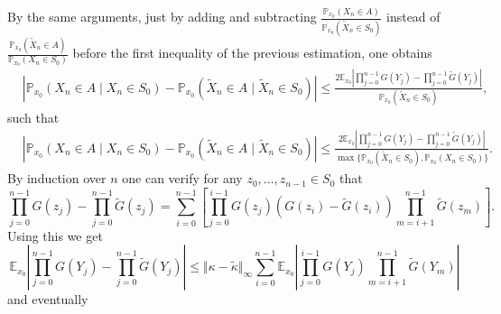 \documentclass{aptpub}
\begin{document}
By the same arguments, just by adding and subtracting $\frac{\mathbb{P}_{x_0}(X_n\in A)}{\mathbb{P}_{x_0}(\widetilde{X}_n\in S_0)}$ instead of $\frac{\mathbb{P}_{x_0}(\widetilde{X}_n\in A)}{\mathbb{P}_{x_0}(X_n\in S_0)}$ before the first inequality of the previous estimation, one obtains
\begin{align*}
		&  \left \vert \mathbb{P}_{x_0}(X_n\in A\mid X_n\in S_0) 
	- \mathbb{P}_{x_0}(\widetilde{X}_n\in A\mid \widetilde{X}_n\in S_0)\right \vert 
	\leq 	
  \frac{2  \mathbb{E}_{x_0}\left \vert \prod_{j=0}^{n-1} G(Y_j) 
		- \prod_{j=0}^{n-1} \widetilde{G}(Y_j) \right \vert}{\mathbb{P}_{x_0}(\widetilde{X}_n\in S_0)},
\end{align*}
such that
\begin{align} \label{eq: 1st_estimate}
& \left \vert \mathbb{P}_{x_0}(X_n\in A\mid X_n\in S_0) 
- \mathbb{P}_{x_0}(\widetilde{X}_n\in A\mid \widetilde{X}_n\in S_0)\right \vert  
\leq  \frac{2  \mathbb{E}_{x_0}\left \vert \prod_{j=0}^{n-1} G(Y_j) 
	- \prod_{j=0}^{n-1} \widetilde{G}(Y_j) \right \vert}{\max\{\mathbb{P}_{x_0}(\widetilde{X}_n\in S_0),\mathbb{P}_{x_0}(X_n\in S_0)\}}.
\end{align}
By induction over $n$ one can verify for any $z_0,\dots,z_{n-1}\in S_0$ that
\[
 \prod_{j=0}^{n-1} G(z_j) 
 - \prod_{j=0}^{n-1} \widetilde{G}(z_j)	= \sum_{i=0}^{n-1} \left[ \prod_{j=0}^{i-1} G(z_j) (G(z_i)-\widetilde G(z_i)) \prod_{m=i+1}^{n-1} \widetilde{G} (z_m) \right].
\] 
Using this we get
\begin{equation} \label{eq: 2nd_estimate}
	\mathbb{E}_{x_0}\left \vert \prod_{j=0}^{n-1} G(Y_j) 
	- \prod_{j=0}^{n-1} \widetilde{G}(Y_j) \right \vert
	\leq  \Vert \kappa-\widetilde{\kappa}\Vert_{\infty} \sum_{i=0}^{n-1} 
	\mathbb{E}_{x_0} \left \vert \prod_{j=0}^{i-1}G(Y_j) \prod_{m=i+1}^{n-1} 
				\widetilde{G}(Y_{m})   \right \vert
\end{equation}
and eventually
\end{document}
